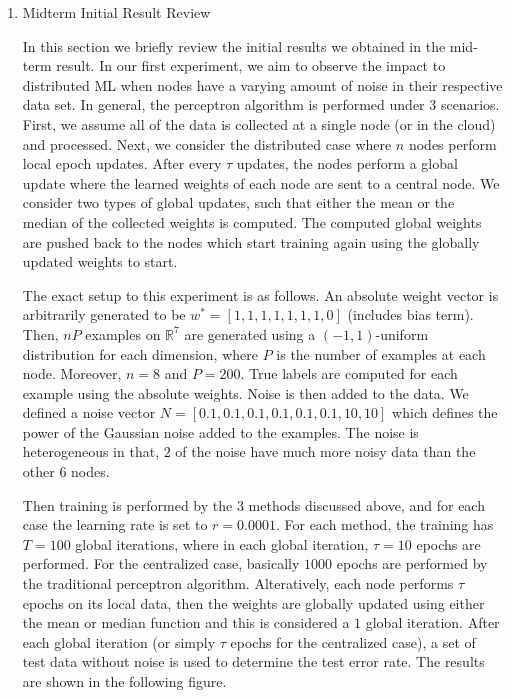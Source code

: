\documentclass[11pt, fullpage,letterpaper]{article}
\begin{document}
\begin{enumerate}
\begin{enumerate}
\end{enumerate}

\item Midterm Initial Result Review

In this section we briefly review the initial results we obtained in the mid-term result. In our first experiment, we aim to observe the impact to distributed ML when nodes have a varying amount of noise in their respective data set. In general, the perceptron algorithm is performed under $3$ scenarios. First, we assume all of the data is collected at a single node (or in the cloud) and processed. Next, we consider the distributed case where $n$ nodes perform local epoch updates. After every $\tau$ updates, the nodes perform a global update where the learned weights of each node are sent to a central node. We consider two types of global updates, such that either the mean or the median of the collected weights is computed. The computed global weights are pushed back to the nodes which start training again using the globally updated weights to start.

The exact setup to this experiment is as follows. An absolute weight vector is arbitrarily generated to be $w^* = [1,1,1,1,1,1,1,0]$ (includes bias term). Then, $nP$ examples on $\mathbb{R}^7$ are generated using a $(-1,1)$-uniform distribution for each dimension, where $P$ is the number of examples at each node. Moreover, $n=8$ and $P=200$. True labels are computed for each example using the absolute weights. Noise is then added to the data. We defined a noise vector $N=[0.1, 0.1, 0.1, 0.1, 0.1, 0.1, 10, 10]$ which defines the power of the Gaussian noise added to the examples. The noise is heterogeneous in that, $2$ of the noise have much more noisy data than the other $6$ nodes.

Then training is performed by the $3$ methods discussed above, and for each case the learning rate is set to $r=0.0001$. For each method, the training has $T=100$ global iterations, where in each global iteration, $\tau=10$ epochs are performed. For the centralized case, basically $1000$ epochs are performed by the traditional perceptron algorithm. Alteratively, each node performs $\tau$ epochs on its local data, then the weights are globally updated using either the mean or median function and this is considered a $1$ global iteration. After each global iteration (or simply $\tau$ epochs for the centralized case), a set of test data without noise is used to determine the test error rate. The results are shown in the following figure.


\end{enumerate}
\end{document}
